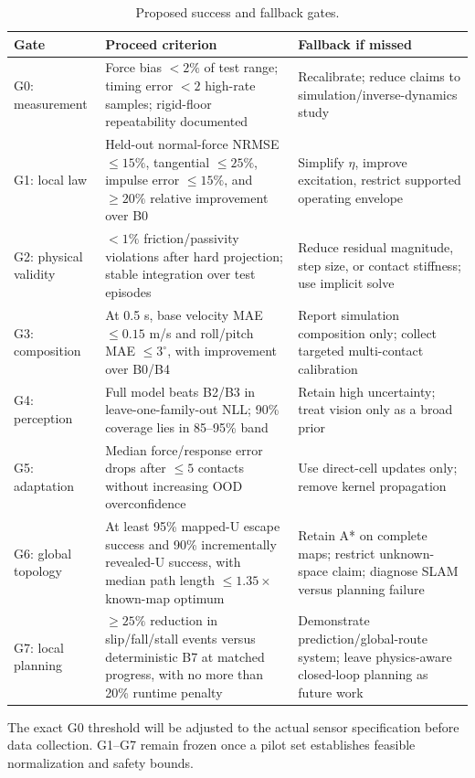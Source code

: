 \begin{table}[ht]
\centering
\caption{Proposed success and fallback gates.}
\label{tab:gates}
\small
\begin{tabularx}{\textwidth}{@{}L{24mm}Y Y@{}}
\toprule
\textbf{Gate} & \textbf{Proceed criterion} & \textbf{Fallback if missed}\\
\midrule
G0: measurement & Force bias $<2\%$ of test range; timing error $<2$ high-rate samples; rigid-floor repeatability documented & Recalibrate; reduce claims to simulation/inverse-dynamics study\\
G1: local law & Held-out normal-force NRMSE $\le15\%$, tangential $\le25\%$, impulse error $\le15\%$, and $\ge20\%$ relative improvement over B0 & Simplify $\eta$, improve excitation, restrict supported operating envelope\\
G2: physical validity & $<1\%$ friction/passivity violations after hard projection; stable integration over test episodes & Reduce residual magnitude, step size, or contact stiffness; use implicit solve\\
G3: composition & At 0.5 s, base velocity MAE $\le 0.15$ m/s and roll/pitch MAE $\le3^\circ$, with improvement over B0/B4 & Report simulation composition only; collect targeted multi-contact calibration\\
G4: perception & Full model beats B2/B3 in leave-one-family-out NLL; 90\% coverage lies in 85--95\% band & Retain high uncertainty; treat vision only as a broad prior\\
G5: adaptation & Median force/response error drops after $\le5$ contacts without increasing OOD overconfidence & Use direct-cell updates only; remove kernel propagation\\
G6: global topology & At least 95\% mapped-U escape success and 90\% incrementally revealed-U success, with median path length $\le1.35\times$ known-map optimum & Retain A* on complete maps; restrict unknown-space claim; diagnose SLAM versus planning failure\\
G7: local planning & $\ge25\%$ reduction in slip/fall/stall events versus deterministic B7 at matched progress, with no more than 20\% runtime penalty & Demonstrate prediction/global-route system; leave physics-aware closed-loop planning as future work\\
\bottomrule
\end{tabularx}
\end{table}

The exact G0 threshold will be adjusted to the actual sensor specification before data collection. G1--G7 remain frozen once a pilot set establishes feasible normalization and safety bounds.

